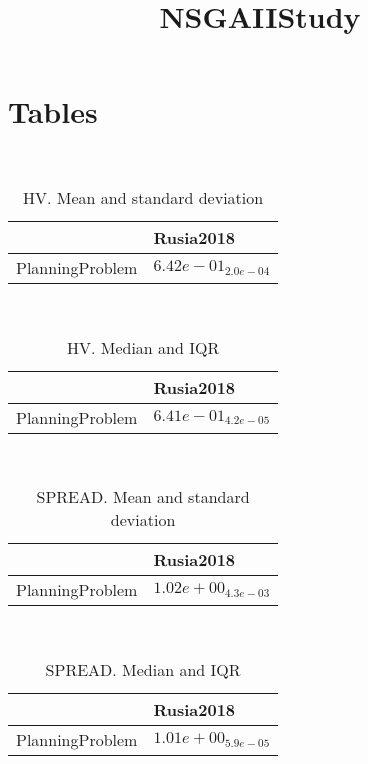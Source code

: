 \documentclass{article}
\title{NSGAIIStudy}
\author{}
\begin{document}
\maketitle
\section{Tables}
\
\begin{table}
\caption{HV. Mean and standard deviation}
\label{table:mean.HV}
\centering
\begin{scriptsize}
\begin{tabular}{ll}
\hline &  Rusia2018\\
\hline
PlanningProblem & \cellcolor{gray95}$  6.42e-01_{ 2.0e-04}$ \\
\hline
\end{tabular}
\end{scriptsize}
\end{table}
\
\begin{table}
\caption{HV. Median and IQR}
\label{table:median.HV}
\begin{scriptsize}
\centering
\begin{tabular}{ll}
\hline &  Rusia2018\\
\hline
PlanningProblem & \cellcolor{gray95}$  6.41e-01_{ 4.2e-05}$ \\
\hline
\end{tabular}
\end{scriptsize}
\end{table}
\
\begin{table}
\caption{SPREAD. Mean and standard deviation}
\label{table:mean.SPREAD}
\centering
\begin{scriptsize}
\begin{tabular}{ll}
\hline &  Rusia2018\\
\hline
PlanningProblem & \cellcolor{gray95}$  1.02e+00_{ 4.3e-03}$ \\
\hline
\end{tabular}
\end{scriptsize}
\end{table}
\
\begin{table}
\caption{SPREAD. Median and IQR}
\label{table:median.SPREAD}
\begin{scriptsize}
\centering
\begin{tabular}{ll}
\hline &  Rusia2018\\
\hline
PlanningProblem & \cellcolor{gray95}$  1.01e+00_{ 5.9e-05}$ \\
\hline
\end{tabular}
\end{scriptsize}
\end{table}
\end{document}
